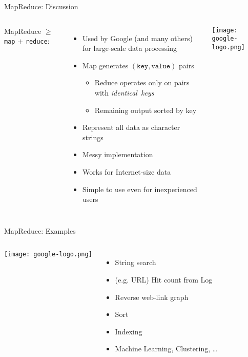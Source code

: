 \documentclass[english,compress]{beamer}
\begin{document}
\begin{frame}{MapReduce: Discussion}
  \begin{columns}
      MapReduce $\ge$ \texttt{map} $+$ \texttt{reduce}:

      \begin{itemize}
        \item Used by Google (and many others) for large-scale data
          processing
        \item Map generates $(\texttt{key},\texttt{value})$ pairs
          \begin{itemize}
            \item Reduce operates only on pairs with \emph{identical~keys}
            \item Remaining output sorted by key
          \end{itemize}
        \item Represent all data as character strings
        \item Messy implementation
        \item Works for Internet-size data
        \item Simple to use even for inexperienced users
      \end{itemize}
      \texttt{[image: google-logo.png]}
  \end{columns}
\end{frame}
\begin{frame}{MapReduce: Examples}
  \begin{columns}
      \texttt{[image: google-logo.png]}
      \begin{itemize}
        \item String search
        \item (e.g. URL) Hit count from Log
        \item Reverse web-link graph
        \item Sort
        \item Indexing
        \item Machine Learning, Clustering, \dots
      \end{itemize}
  \end{columns}
\end{frame}
\end{document}
